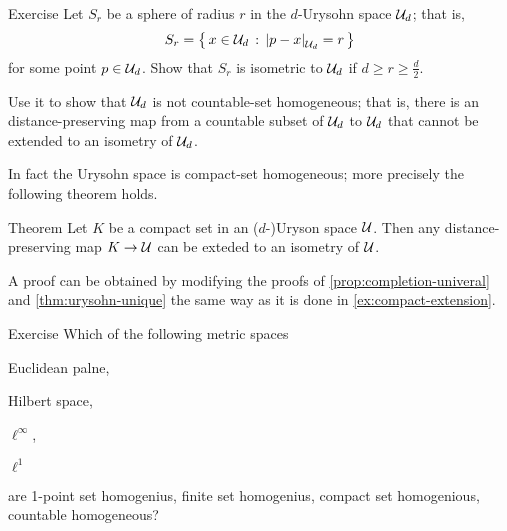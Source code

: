 \begin{thm}{Exercise}\label{ex:sphere-in-urysohn}
Let $S_r$ be a sphere of radius $r$ in the $d$-Urysohn space $\mathcal{U}_d$;
that is, 
\[S_r=\set{x\in \spc{U}_d}{\dist{p}{x}{\spc{U}_d}=r}\]
for some point $p\in \mathcal{U}_d$.
Show that $S_r$ is isometric to $\mathcal{U}_d$ if $d\ge r\ge \tfrac d2$.

Use it to show that $\mathcal{U}_d$ is not countable-set homogeneous;
that is, there is an distance-preserving map from a countable subset of $\mathcal{U}_d$ to $\mathcal{U}_d$ that cannot be extended to an isometry of $\mathcal{U}_d$.
\end{thm}

In fact the Urysohn space is compact-set homogeneous; more precisely the following theorem holds.

\begin{thm}{Theorem}\label{thm:compact-homogeneous}
Let $K$ be a compact set in an ($d$-)Uryson space $\mathcal{U}$.
Then any distance-preserving map $K\to \mathcal{U}$ can be exteded to an isometry of $\mathcal{U}$.
\end{thm}

A proof can be obtained by modifying the proofs of \ref{prop:completion-univeral} and \ref{thm:urysohn-unique}
the same way as it is done in \ref{ex:compact-extension}.

\begin{thm}{Exercise} Which of the following metric spaces
\begin{subthm}{}
Euclidean palne,
\end{subthm}

\begin{subthm}{}
 Hilbert space,
\end{subthm}

\begin{subthm}{}
 $\ell^\infty$,
\end{subthm}

\begin{subthm}{}
 $\ell^1$
\end{subthm}
are 
1-point set homogenius, finite set homogenius, compact set homogenious, countable homogeneous?
\end{thm}









